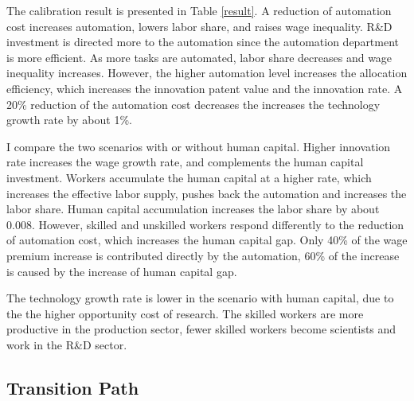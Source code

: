 \documentclass[12pt]{article}
\begin{document}
The calibration result is presented in Table \ref{result}. A reduction of automation cost increases automation, lowers labor share, and raises wage inequality. R\&D investment is directed more to the automation since the automation department is more efficient. As more tasks are automated, labor share decreases and wage inequality increases. However, the higher automation level increases the allocation efficiency, which increases the innovation patent value and the innovation rate. A 20\% reduction of the automation cost decreases the increases the technology growth rate by about 1\%. 

I compare the two scenarios with or without human capital. Higher innovation rate increases the wage growth rate, and complements the human capital investment. Workers accumulate the human capital at a higher rate, which increases the effective labor supply, pushes back the automation and increases the labor share. Human capital accumulation increases the labor share by about 0.008. However, skilled and unskilled workers respond differently to the reduction of automation cost, which increases the human capital gap. Only 40\% of the wage premium increase is contributed directly by the automation, 60\% of the increase is caused by the increase of human capital gap. 

The technology growth rate is lower in the scenario with human capital, due to the the higher opportunity cost of research. The skilled workers are more productive in the production sector, fewer skilled workers become scientists and work in the R\&D sector. 

\subsection{Transition Path}
\end{document}
